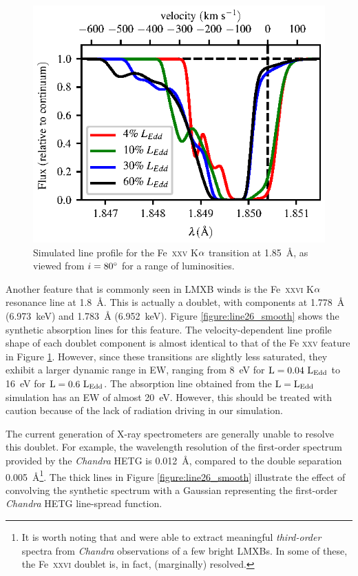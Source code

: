 \documentclass[a4paper,fleqn,usenatbib]{mnras}
\begin{document}
\begin{figure}
\includegraphics[width=\columnwidth]{figures/fig5_80_degrees_fe25.eps}
\caption{Simulated line profile for the Fe~\textsc{xxv} K$\rm{\alpha}$
transition at 1.85~{\AA}, as viewed from $i = 80\degree$ for a range
of luminosities.}
\label{figure:line25}
\end{figure}

Another feature that is commonly seen in LMXB winds is the
Fe~\textsc{xxvi} K$\rm{\alpha}$ resonance line at 1.8~{\AA}. This
is actually a doublet, with components at 1.778~{\AA} (6.973~keV) and
1.783~{\AA} (6.952~keV). Figure \ref{figure:line26_smooth} shows the synthetic
absorption lines for this feature. The velocity-dependent
line profile shape of each doublet component is almost identical to
that of the Fe \textsc{xxv} feature in Figure
\ref{figure:line25}. However, since these transitions are slightly less
saturated, they exhibit a larger dynamic range in EW, ranging from
8~eV for $\rm{L = 0.04~L_{Edd}}$ to 16~eV for $\rm{L = 0.6~L_{Edd}}$.
The absorption line obtained from the $\rm{L = L_{Edd}}$ simulation
has an EW of almost 20~eV. However, this should be treated with
caution because of the lack of radiation driving in our simulation.

The current generation of X-ray spectrometers are generally unable
to resolve this doublet. For example, the wavelength resolution of the
first-order spectrum provided by the \emph{Chandra} HETG is
0.012~\AA, compared to the double separation 0.005~\AA\footnote{It is worth noting that
\citep{2015ApJ...814...87M} and \cite{2016ApJ...821L...9M} were able
to extract meaningful {\em third-order} spectra from \emph{Chandra}
observations of a few bright LMXBs. In some of these, the
Fe~\textsc{xxvi} doublet is, in fact, (marginally) resolved.}.
The thick lines in Figure 
\ref{figure:line26_smooth} illustrate the effect of convolving the
synthetic spectrum with a Gaussian representing the first-order \emph{Chandra}
HETG line-spread function.
\end{document}

